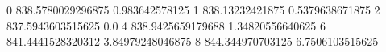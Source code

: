 0 838.5780029296875 0.983642578125
1 838.13232421875 0.5379638671875
2 837.5943603515625 0.0
4 838.9425659179688 1.34820556640625
6 841.4441528320312 3.84979248046875
8 844.344970703125 6.7506103515625
